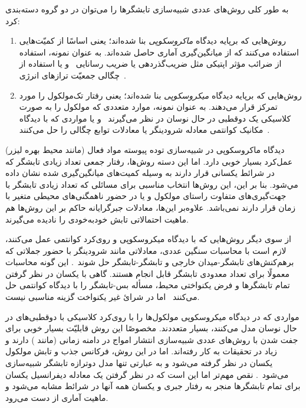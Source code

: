 به طور کلی روش‌های عددی شبیه‌سازی تابشگرها را می‌توان در دو گروه دسته‌بندی کرد:
\begin{enumerate}[label=(\alph*)]
	\item روش‌هایی که برپایه دیدگاه \emph{ماکروسکوپی} بنا شده‌اند؛ یعنی  اساسًا از کمیّت‌هایی استفاده می‌کنند که از میانگین‌گیری آماری حاصل شده‌اند. به عنوان نمونه، استفاده از ضرائب مؤثر اپتیکی مثل ضریب‌گذردهی یا ضریب رسانایی~\cite{cao2000transition,7769917} و یا استفاده از چگالی جمعیّت ترازهای انرژی~\cite{Chang:04,662652,PhysRevA.52.3082}.
	\item روش‌هایی که برپایه دیدگاه \emph{میکروسکوپی} بنا شده‌اند؛ یعنی رفتار تک‌مولکول را مورد تمرکز قرار می‌دهند. به عنوان نمونه، موارد متعددی که مولکول را به صورت کلاسیکی یک دوقطبی در حال نوسان در نظر می‌گیرند~\cite{PhysRevLett.95.013904,genevet2010large,wang2011optical,bauch2013collective,Hoang2015,javadi2018numerical} و یا مواردی که با دیدگاه مکانیک کوانتمی معادله شرودینگر یا معادلات توابع چگالی را حل می‌کنند~\cite{PhysRevB.82.075427,PhysRevA.45.4879,Hong_2015,doi:10.1021/jp1043392}.
\end{enumerate}

دیدگاه ماکروسکوپی در شبیه‌سازی توده پیوسته مواد فعال (مانند محیط بهره لیزر) عمل‌کرد بسیار خوبی دارد. اما این دسته روش‌ها، رفتار جمعی تعداد زیادی تابشگر که در شرائط یکسانی قرار دارند به وسیله کمیت‌های میانگین‌گیری شده نشان داده مي‌شود. بنا بر این، این روش‌ها انتخاب مناسبی برای مسائلی که تعداد زیادی تابشگر با جهت‌گیری‌های متفاوت راستای مولکول و یا در حضور ناهمگنی‌‌های محیطی متغیر با زمان قرار دارند نمی‌باشد. علاوه‌بر این‌ها، معادلات جبرگرایانه حاکم بر این روش‌ها هم ماهیت احتمالاتی تابش خود‌به‌خودی را نادیده می‌گیرند.

از سوی دیگر روش‌هایی که با دیدگاه میکروسکوپی و روی‌کرد کوانتمی عمل می‌کنند، لازم است با محاسبات سنگین عددی، معادلاتی مانند شرودینگر با حضور جملاتی که برهم‌کنش‌های تابشگر-میدان خارجی و تابشگر-تابشگر حل شوند~\cite{doi:10.1021/jp1043392}. این گونه محاسبات معمولًا برای تعداد معدودی تابشگر قابل انجام هستند. گاهی با یکسان در نظر گرفتن تمام تابشگرها و فرض یکنواختی محیط، مسأله بس-تابشگر را با دیدگاه کوانتمی حل می‌کنند~\cite{PhysRevB.91.035306} اما در شرائ غیر یکنواخت گزینه مناسبی نیست.

مواردی که در دیدگاه میکروسکوپی مولکول‌ها را با روی‌کرد کلاسیکی با دوقطبی‌های در حال نوسان مدل می‌کنند، بسیار متعددند. مخصوصًا این روش قابلیّت بسیار خوبی برای جفت شدن با روش‌های عددی شبیه‌سازی انتشار امواج در دامنه زمانی (مانند ) دارند و زیاد در تحقیقات به کار رفته‌اند. اما در این روش، فرکانس جذب و تابش مولکول یکسان در نظر گرفته می‌شود و به عبارتی تنها مدل دوترازه تابشگر شبیه‌سازی می‌شود~\cite{Witthaut_2010,PhysRevLett.106.053601}. نقص مهم‌تر اما این است که در نظر گرفتن یک معادله دیفرانسیل یکسان برای تمام تابشگرها منجر به رفتار جبری و یکسان همه آنها در شرائط مشابه می‌شود و ماهیت آماری از دست می‌رود.

